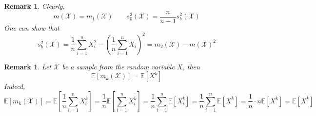 \documentclass[12pt]{article}
\newtheorem{remark}[theorem]{Remark}
\begin{document}
\begin{remark} Clearly,
    $$
        m(\mathscr{X})=m_{1}(\mathscr{X})
        \quad\quad
        s_{0}^2(\mathscr{X})=\frac{n}{n-1}s_b^2(\mathscr{X})
    $$
    One can show that
    $$
        s_b^2(\mathscr{X})
        =\frac{1}{n}
        \sum_{i=1}^n X_i^2-{\left(\frac{1}{n}\sum_{i=1}^n X_i\right)}^2
        =m_2(\mathscr{X})-{m(\mathscr{X})}^2
    $$
\end{remark}

\begin{remark} Let $\mathscr{X}$ be a sample from the random variable $X$, then
    $$
        \mathbb{E}[m_{k}(\mathscr{X})]=\mathbb{E}[X^k]
    $$
    Indeed,
    $$
        \mathbb{E}[m_{k}(\mathscr{X})]
        =\mathbb{E}\left[\frac{1}{n}\sum_{i=1}^n X_i^k\right]
        =\frac{1}{n}\mathbb{E}\left[\sum_{i=1}^n X_i^k\right]
        =\frac{1}{n}\sum_{i=1}^n \mathbb{E}[X_i^k]
        =\frac{1}{n}\sum_{i=1}^n \mathbb{E}[X^k]
        =\frac{1}{n}\cdot n\mathbb{E}[X^k]
        =\mathbb{E}[X^k]
    $$
\end{remark}
\end{document}
